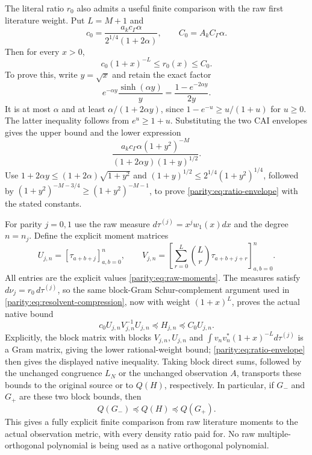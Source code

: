 \documentclass[11pt]{article}
\begin{document}
The literal ratio $r_0$ also admits a useful finite comparison
with the raw first literature weight. Put $L=M+1$ and
\begin{equation}\label{parity:eq:ratio-constants}
 c_0=\frac{a_kc_\Gamma\alpha}{2^{1/4}(1+2\alpha)},
 \qquad C_0=A_kC_\Gamma\alpha.
\end{equation}
Then for every $x>0$,
\begin{equation}\label{parity:eq:ratio-envelope}
 c_0(1+x)^{-L}\leq r_0(x)\leq C_0.
\end{equation}
To prove this, write $y=\sqrt x$ and retain the exact factor
\[
 e^{-\alpha y}\frac{\sinh(\alpha y)}y
    =\frac{1-e^{-2\alpha y}}{2y}.
\]
It is at most $\alpha$ and at least
$\alpha/(1+2\alpha y)$, since $1-e^{-u}\geq u/(1+u)$ for $u\geq0$.
The latter inequality follows from $e^u\geq1+u$.
Substituting the two CAI envelopes gives the upper bound and the
lower expression
\[
 \frac{a_kc_\Gamma\alpha(1+y^2)^{-M}}
                   {(1+2\alpha y)(1+y)^{1/2}}.
\]
Use $1+2\alpha y\leq(1+2\alpha)\sqrt{1+y^2}$ and
$(1+y)^{1/2}\leq2^{1/4}(1+y^2)^{1/4}$, followed by
$(1+y^2)^{-M-3/4}\geq(1+y^2)^{-M-1}$, to prove
\eqref{parity:eq:ratio-envelope} with the stated constants.

For parity $j=0,1$ use the raw measure
$d\tau^{(j)}=x^jw_1(x)dx$ and the degree $n=n_j$. Define the
explicit moment matrices
\[
 U_{j,n}=[\tau_{a+b+j}]_{a,b=0}^n,\qquad
 V_{j,n}=\left[\sum_{r=0}^L\binom Lr\tau_{a+b+j+r}\right]_{a,b=0}^n.
\]
All entries are the explicit values \eqref{parity:eq:raw-moments}.
The measures satisfy $d\nu_j=r_0\,d\tau^{(j)}$, so the same
block-Gram Schur-complement argument used in
\eqref{parity:eq:resolvent-compression}, now with weight $(1+x)^L$,
proves the actual native bound
\begin{equation}\label{parity:eq:raw-matrix-bound}
 \boxed{c_0 U_{j,n}V_{j,n}^{-1}U_{j,n}
             \preceq H_{j,n}\preceq C_0U_{j,n}.}
\end{equation}
Explicitly, the block matrix with blocks $V_{j,n},U_{j,n}$ and
$\int v_nv_n^*(1+x)^{-L}d\tau^{(j)}$ is a Gram matrix, giving
the lower rational-weight bound; \eqref{parity:eq:ratio-envelope}
then gives the displayed native inequality.
Taking block direct sums, followed by the unchanged congruence
$L_N$ or the unchanged observation $A$, transports these bounds
to the original source or to $Q(H)$, respectively. In particular,
if $G_-$ and $G_+$ are these two block bounds, then
\[
 Q(G_-)\preceq Q(H)\preceq Q(G_+).
\]
This gives a fully explicit finite comparison from raw literature
moments to the actual observation metric, with every density
ratio paid for. No raw multiple-orthogonal polynomial is being
used as a native orthogonal polynomial.
\end{document}
